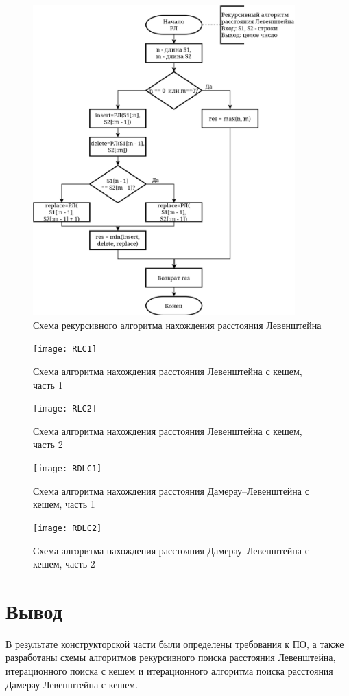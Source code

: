 \begin{figure}[h]
	\centering
	\includegraphics[width=0.9\textwidth]{RL}
	\caption{Схема рекурсивного алгоритма нахождения расстояния Левенштейна}
	\label{fig:RL}
\end{figure}

\begin{figure}[h]
	\centering
	\texttt{[image: RLС1]}
	\caption{Схема алгоритма нахождения расстояния Левенштейна с кешем, часть 1}
	\label{fig:RLC1}
\end{figure}

\begin{figure}[h]
	\centering
	\texttt{[image: RLC2]}
	\caption{Схема алгоритма нахождения расстояния Левенштейна с кешем, часть 2}
	\label{fig:RLC2}
\end{figure}

\begin{figure}[h]
	\centering
	\texttt{[image: RDLC1]}
	\caption{Схема алгоритма нахождения расстояния Дамерау–Левенштейна с кешем, часть 1}
	\label{fig:RDLC1}
\end{figure}


\begin{figure}[t]
	\centering
	\texttt{[image: RDLC2]}
	\caption{Схема алгоритма нахождения расстояния Дамерау–Левенштейна с кешем, часть 2}
	\label{fig:RDLC2}
\end{figure}

\clearpage


\section{Вывод}

В результате конструкторской части были определены требования к ПО, а также разработаны схемы алгоритмов рекурсивного поиска расстояния Левенштейна, итерационного поиска с кешем и итерационного алгоритма поиска расстояния Дамерау-Левенштейна с кешем.

\clearpage
